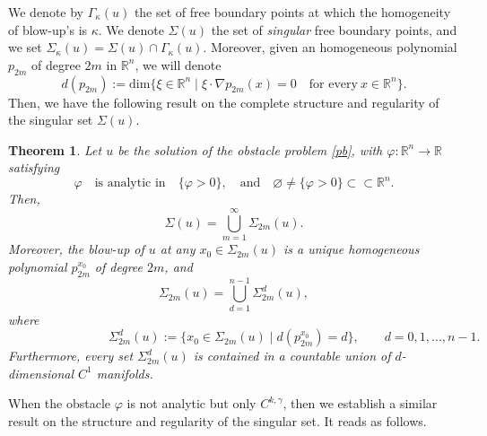 \documentclass[11pt]{amsart}
\theoremstyle{plain}
\newtheorem{thrm}{Theorem}[section]
\numberwithin{equation}{section}
\begin{document}
We denote by $\Gamma_\kappa(u)$ the set of free boundary points at which the homogeneity of blow-up's is $\kappa$.
We denote $\Sigma(u)$ the set of \emph{singular} free boundary points, and we set $\Sigma_\kappa(u)=\Sigma(u)\cap\Gamma_\kappa(u)$.
Moreover, given an homogeneous polynomial $p_{2m}$ of degree $2m$ in ${\mathbb R}^n$, we will denote
\[d(p_{2m}):=\textrm{dim}\bigl\{\xi\in {\mathbb R}^n\mid \xi\cdot \nabla p_{2m}(x) = 0\quad\textrm{for every}\ x\in{\mathbb R}^n\bigr\}.\]
Then, we have the following result on the complete structure and regularity of the singular set $\Sigma(u)$.

\begin{thrm}\label{th-analytic}
Let $u$ be the solution of the obstacle problem \eqref{pb}, with $\varphi:{\mathbb R}^n\to{\mathbb R}$ satisfying
\begin{equation}\label{obstacle-analytic}
\varphi\quad \textrm{is analytic in}\quad \{\varphi>0\},\quad \textrm{and}\quad\varnothing\neq \{\varphi>0\}\subset\subset{\mathbb R}^n.
\end{equation}
Then,
\[\Sigma(u)=\bigcup_{m=1}^\infty \Sigma_{2m}(u).\]
Moreover, the blow-up of $u$ at any $x_0\in \Sigma_{2m}(u)$ is a {unique} homogeneous polynomial $p_{2m}^{x_0}$ of degree $2m$, and
\[\Sigma_{2m}(u)=\bigcup_{d=1}^{n-1}\Sigma_{2m}^d(u),\]
where
\begin{equation}\label{Sigma-2m-d}
\qquad\qquad\qquad\qquad\Sigma_{2m}^d(u):=\bigl\{x_0\in \Sigma_{2m}(u)\mid d(p_{2m}^{x_0})=d\bigr\},\qquad d=0,1,...,n-1.
\end{equation}
Furthermore, every set $\Sigma_{2m}^d(u)$ is contained in a countable union of $d$-dimensional $C^1$ manifolds.
\end{thrm}

When the obstacle $\varphi$ is not analytic but only $C^{k,\gamma}$, then we establish a similar result on the structure and regularity of the singular set.
It reads as follows.
\end{document}
